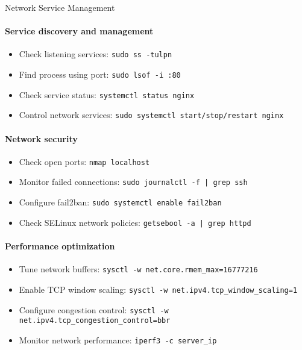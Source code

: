 \begin{KR}{Network Service Management}\\
    \paragraph{Service discovery and management}
    \begin{itemize}
        \item Check listening services: \texttt{sudo ss -tulpn}
        \item Find process using port: \texttt{sudo lsof -i :80}
        \item Check service status: \texttt{systemctl status nginx}
        \item Control network services: \texttt{sudo systemctl start/stop/restart nginx}
    \end{itemize}
    
    \paragraph{Network security}
    \begin{itemize}
        \item Check open ports: \texttt{nmap localhost}
        \item Monitor failed connections: \texttt{sudo journalctl -f | grep ssh}
        \item Configure fail2ban: \texttt{sudo systemctl enable fail2ban}
        \item Check SELinux network policies: \texttt{getsebool -a | grep httpd}
    \end{itemize}
    
    \paragraph{Performance optimization}
    \begin{itemize}
        \item Tune network buffers: \texttt{sysctl -w net.core.rmem\_max=16777216}
        \item Enable TCP window scaling: \texttt{sysctl -w net.ipv4.tcp\_window\_scaling=1}
        \item Configure congestion control: \texttt{sysctl -w net.ipv4.tcp\_congestion\_control=bbr}
        \item Monitor network performance: \texttt{iperf3 -c server\_ip}
    \end{itemize}
\end{KR}


